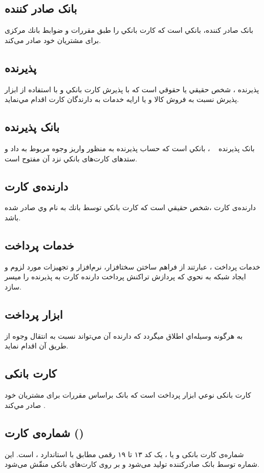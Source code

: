\documentclass[oneside]{report}
\begin{document}
\subsection{بانک صادر کننده}			
		بانک صادر کننده،   بانكي است كه كارت بانكي را طبق مقررات و ضوابط بانك مركزی برای مشتريان خود صادر
می‌كند.
\subsection{پذیرنده}
پذیرنده ،   شخص حقيقي يا حقوقي است كه با پذيرش كارت بانكي و با استفاده از ابزار پذيرش نسبت به
فروش كالا و يا ارايه خدمات به دارندگان كارت اقدام مي‌نمايد.  			 				
	  			 				
\subsection{بانک پذیرنده}
بانک پذیرنده 
	، بانكي است كه حساب پذيرنده به منظور واريز وجوه مربوط به داد و ستدهای كارت‌های‌		بانكي نزد آن مفتوح است. 
		
\subsection{دارنده‌ی کارت}		
		دارنده‌ی کارت 
	  			 				،شخص حقيقي است كه كارت بانكي توسط بانك به نام وي صادر شده باشد.			 		
\subsection{خدمات پرداخت}
خدمات پرداخت 		
			  			 				، عبارتند از فراهم ساختن سختافزار، نرم‌افزار و تجهيزات مورد لزوم و ايجاد شبكه به نحوي كه
پردازش تراكنش پرداخت دارنده كارت به پذيرنده را ميسر سازد. 
\subsection{ابزار پرداخت}
به هرگونه وسيله‌اي اطلاق ميگردد كه دارنده آن مي‌تواند نسبت به انتقال وجوه از طريق آن اقدام
نمايد. 
\subsection{کارت بانکی}
کارت بانکی
نوعي ابزار پرداخت است كه بانک براساس مقررات برای مشتريان خود صادر مي‌كند
\cite{centralbank}.

\subsection{شماره‌ی کارت   ({\normalsize {}}) }
شماره‌ی کارت بانکی و یا 
					{\normalsize {}}
			 ، 
			یک کد ۱۳ تا ۱۹ رقمی  مطابق با استاندارد {\normalsize {}}،
			است.
					این شماره توسط بانک صادر‌کننده تولید می‌شود و بر روی کارت‌های بانکی منقّش می‌شود. 
\end{document}
